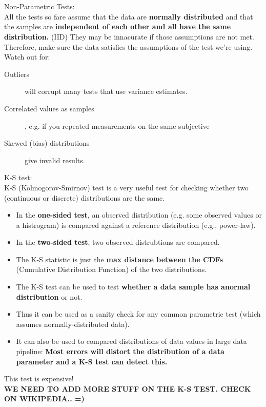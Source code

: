 \documentclass[a4paper,11pt,twoside]{article}
\begin{document}
\\\\
Non-Parametric Tests: \\
All the tests so fare assume that the data are {\bf normally distributed} and that the samples are {\bf independent of each other and all have the same distribution.} (IID) They may be innacurate if those assumptions are not met. Therefore, make sure the data satisfies the assumptions of the test we're using. Watch out for:
\begin{description}
 \item[Outliers] will corrupt many tests that use variance estimates.
 \item[Correlated values as samples], e.g. if you repeated measurements on the same subjective
 \item[Skewed (bias) distributions] give invalid results.
\end{description}
K-S test: \\
K-S (Kolmogorov-Smirnov) test is a very useful test for checking whether two (continuous or discrete) distributions are the same. 
\begin{itemize}
 \item In the {\bf one-sided test}, an observed distribution (e.g. some observed values or a histrogram) is compared against a reference distribution (e.g., power-law).
 \item In the {\bf two-sided test}, two observed distrubtions are compared.
 \item The K-S statistic is just the {\bf max distance between the CDFs} (Cumulative Distribution Function) of the two distributions.
 \item The K-S test can be used to test {\bf whether a data sample has  anormal distribution} or not.
 \item Thus it can be used as a sanity check for any common parametric test (which assumes normally-distributed data).
 \item It can also be used to compared distributions of data values in large data pipeline: {\bf Most errors will distort the distribution of a data parameter and a K-S test can detect this.}
\end{itemize}
This test is expensive! 
\\
{\bf WE NEED TO ADD MORE STUFF ON THE K-S TEST. CHECK ON WIKIPEDIA.. =) }
   






\end{document}
